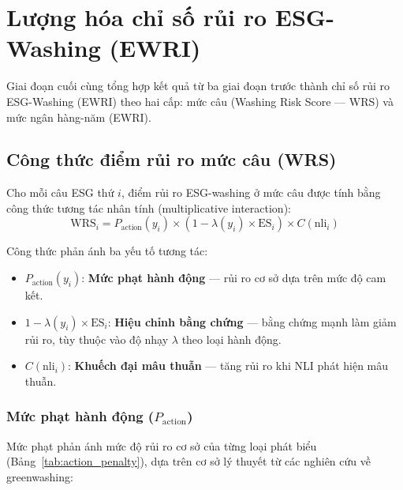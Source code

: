 \section{Lượng hóa chỉ số rủi ro ESG-Washing (EWRI)}
\label{sec:ewri_method}

Giai đoạn cuối cùng tổng hợp kết quả từ ba giai đoạn trước thành chỉ số rủi ro ESG-Washing (EWRI) theo hai cấp: mức câu (Washing Risk Score --- WRS) và mức ngân hàng-năm (EWRI).


\subsection{Công thức điểm rủi ro mức câu (WRS)}
\label{subsec:ewri_formula}

Cho mỗi câu ESG thứ $i$, điểm rủi ro ESG-washing ở mức câu được tính bằng công thức tương tác nhân tính (multiplicative interaction):
\begin{equation}
    \text{WRS}_i = P_{\text{action}}(y_i) \times \left(1 - \lambda(y_i) \times \text{ES}_i\right) \times C(\text{nli}_i)
    \label{eq:wrs}
\end{equation}

\noindent Công thức phản ánh ba yếu tố tương tác:
\begin{itemize}
    \item $P_{\text{action}}(y_i)$: \textbf{Mức phạt hành động} --- rủi ro cơ sở dựa trên mức độ cam kết.
    \item $1 - \lambda(y_i) \times \text{ES}_i$: \textbf{Hiệu chỉnh bằng chứng} --- bằng chứng mạnh làm giảm rủi ro, tùy thuộc vào độ nhạy $\lambda$ theo loại hành động.
    \item $C(\text{nli}_i)$: \textbf{Khuếch đại mâu thuẫn} --- tăng rủi ro khi NLI phát hiện mâu thuẫn.
\end{itemize}


\subsubsection{Mức phạt hành động ($P_{\text{action}}$)}

Mức phạt phản ánh mức độ rủi ro cơ sở của từng loại phát biểu (Bảng~\ref{tab:action_penalty}), dựa trên cơ sở lý thuyết từ các nghiên cứu về greenwashing:

